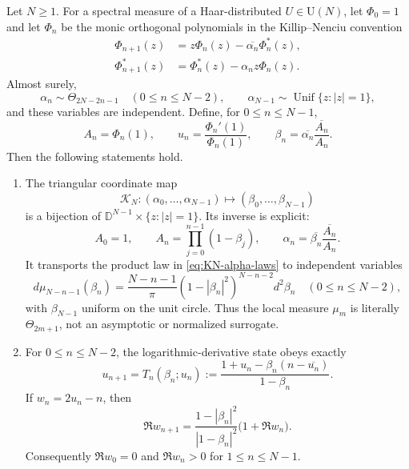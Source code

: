 \begin{theorem}
\label{thm:verblunsky-peel-derived}
Let $N\geq1$.  For a spectral measure of a Haar-distributed $U\in\mathrm U(N)$, let
$\Phi_0=1$ and let $\Phi_n$ be the monic orthogonal polynomials in the Killip--Nenciu
convention
\begin{align}
 \Phi_{n+1}(z)&=z\Phi_n(z)-\overline{\alpha_n}\Phi_n^*(z),
 \label{eq:KN-szego-forward}\\
 \Phi_{n+1}^*(z)&=\Phi_n^*(z)-\alpha_n z\Phi_n(z).
 \label{eq:KN-szego-reversed}
\end{align}
Almost surely,
\begin{equation}
 \alpha_n\sim\Theta_{2N-2n-1}\quad(0\leq n\leq N-2),
 \qquad
 \alpha_{N-1}\sim\operatorname{Unif}\{z:|z|=1\},
 \label{eq:KN-alpha-laws}
\end{equation}
and these variables are independent.  Define, for $0\leq n\leq N-1$,
\begin{equation}
 A_n=\Phi_n(1),\qquad
 u_n=\frac{\Phi_n'(1)}{\Phi_n(1)},\qquad
 \beta_n=\overline{\alpha_n}\frac{\overline{A_n}}{A_n}.
 \label{eq:peel-triangular-coordinates}
\end{equation}
Then the following statements hold.

\begin{enumerate}
 \item The triangular coordinate map
 \begin{equation}
  \mathcal K_N:(\alpha_0,\ldots,\alpha_{N-1})\longmapsto
  (\beta_0,\ldots,\beta_{N-1})
  \label{eq:KN-triangular-map}
 \end{equation}
 is a bijection of $\mathbb D^{N-1}\times\{z:|z|=1\}$.  Its inverse is explicit:
 \begin{equation}
  A_0=1,\qquad A_n=\prod_{j=0}^{n-1}(1-\beta_j),\qquad
  \alpha_n=\overline{\beta_n}\frac{\overline{A_n}}{A_n}.
  \label{eq:KN-triangular-inverse}
 \end{equation}
 It transports the product law in \eqref{eq:KN-alpha-laws} to independent variables
 \begin{equation}
  d\mu_{N-n-1}(\beta_n)
  =\frac{N-n-1}{\pi}(1-|\beta_n|^2)^{N-n-2}d^2\beta_n
  \quad(0\leq n\leq N-2),
  \label{eq:KN-mu-exact}
 \end{equation}
 with $\beta_{N-1}$ uniform on the unit circle.  Thus the local measure
 $\mu_m$ is literally $\Theta_{2m+1}$, not an asymptotic or normalized surrogate.

 \item For $0\leq n\leq N-2$, the logarithmic-derivative state obeys exactly
 \begin{equation}
  u_{n+1}=T_n(\beta_n;u_n)
  :=\frac{1+u_n-\beta_n(n-\overline{u_n})}{1-\beta_n}.
  \label{eq:KN-derived-T}
 \end{equation}
 If $w_n=2u_n-n$, then
 \begin{equation}
  \Re w_{n+1}
  =\frac{1-|\beta_n|^2}{|1-\beta_n|^2}\bigl(1+\Re w_n\bigr).
  \label{eq:KN-half-plane-propagation}
 \end{equation}
 Consequently $\Re w_0=0$ and $\Re w_n>0$ for $1\leq n\leq N-1$.


\end{enumerate}
\end{theorem}

